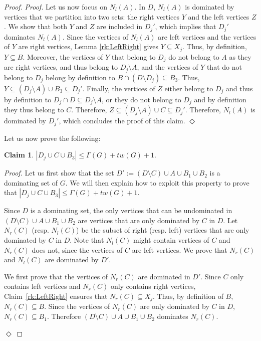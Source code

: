 \documentclass[10pt]{article}
\newtheorem{claim}{Claim}
\newenvironment{proofclaim}[1][]%
    {\noindent \emph{Proof.} {}{#1}{}}{\hfill
    $\Diamond$\vspace{1em}}
\begin{document}
\begin{proof}
\begin{proofclaim}
Let us now focus on $N_l(A)$. In $D$, $N_l(A)$ is dominated by vertices that we partition into two sets: the right vertices $Y$ and the left vertices $Z$. We show that both $Y$ and $Z$ are included in $D_j'$, which implies that $D_j'$ dominates $N_l(A)$. Since the vertices of $N_l(A)$ are left vertices and the vertices of $Y$ are right vertices, Lemma \ref{rk:LeftRight} gives $Y\subseteq X_j$. Thus, by definition, $Y\subseteq B$. Moreover, the vertices of $Y$ that belong to $D_j$ do not belong to $A$ as they are right vertices, and thus belong to $D_j\setminus A$, and the vertices of $Y$ that do not belong to $D_j$ belong by definition to $B\cap(D\setminus D_j)\subseteq B_3$. Thus, $Y\subseteq (D_j\setminus A)\cup B_3\subseteq D_j'$. Finally, the vertices of $Z$ either belong to $D_j$ and thus by definition to $D_j\cap D\subseteq D_j\setminus A$, or they do not belong to $D_j$ and by definition they thus belong to $C$. Therefore, $Z\subseteq (D_j\setminus A)\cup C\subseteq D_j'$. Therefore, $N_l(A)$ is dominated by $D_j'$, which concludes the proof of this claim.
\end{proofclaim}

Let us now prove the following:

\begin{claim}\label{cl:valueofk}
$|D_j\cup C \cup B_3|\leq \Gamma(G)+tw(G)+1.$
\end{claim}

\begin{proofclaim}
Let us first show that the set $D':=(D\setminus C)\cup A\cup B_1\cup B_2$ is a dominating set of $G$. We will then explain how to exploit this property to prove that $|D_j\cup C \cup B_3|\leq \Gamma(G)+tw(G)+1$.

Since $D$ is a dominating set, the only vertices that can be undominated in $(D\setminus C)\cup A\cup B_1\cup B_2$ are vertices that are only dominated by $C$ in $D$. Let $N_r(C)$ (resp. $N_l(C)$) be the subset of right (resp. left) vertices that are only dominated by $C$ in $D$. Note that $N_l(C)$ might contain vertices of $C$ and $N_r(C)$ does not, since the vertices of $C$ are left vertices. We prove that $N_r(C)$ and $N_l(C)$ are dominated by $D'$. 

We first prove that the vertices of $N_r(C)$ are dominated in $D'$.  Since $C$ only contains left vertices and $N_r(C)$ only contains right vertices, Claim~\ref{rk:LeftRight} ensures that $N_r(C)\subseteq X_j$. Thus, by definition of $B$, $N_r(C)\subseteq B$. Since the vertices of $N_r(C)$ are only dominated by $C$ in $D$, $N_r(C) \subseteq B_1$. Therefore $(D\setminus C)\cup A\cup B_1\cup B_2$ dominates $N_r(C)$.


\end{proofclaim}
\end{proof}
\end{document}
